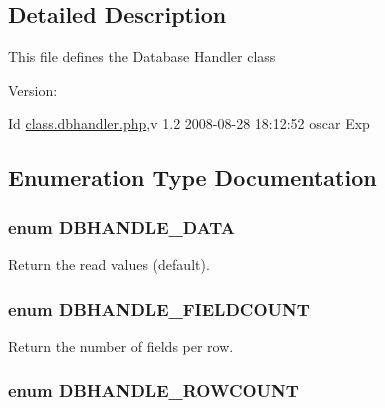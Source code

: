 \subsection{Detailed Description}
This file defines the Database Handler class \begin{Desc}
\item[Version:]\end{Desc}
\begin{Desc}
\item[Id]\hyperlink{class_8dbhandler_8php}{class.dbhandler.php},v 1.2 2008-08-28 18:12:52 oscar Exp \end{Desc}


\subsection{Enumeration Type Documentation}
\hypertarget{class_8dbhandler_8php_cc5178c2a582eafa4ef488ed3394b725}{
\subsubsection{\setlength{\rightskip}{0pt plus 5cm}enum {\bf DBHANDLE\_\-DATA}}}
\label{class_8dbhandler_8php_cc5178c2a582eafa4ef488ed3394b725}


Return the read values (default). 

\hypertarget{class_8dbhandler_8php_fda554c4527b03446f287291626c12ad}{
\subsubsection{\setlength{\rightskip}{0pt plus 5cm}enum {\bf DBHANDLE\_\-FIELDCOUNT}}}
\label{class_8dbhandler_8php_fda554c4527b03446f287291626c12ad}


Return the number of fields per row. 

\hypertarget{class_8dbhandler_8php_c904f05455a162c07c216c330ad7c5c6}{
\subsubsection{\setlength{\rightskip}{0pt plus 5cm}enum {\bf DBHANDLE\_\-ROWCOUNT}}}
\label{class_8dbhandler_8php_c904f05455a162c07c216c330ad7c5c6}


